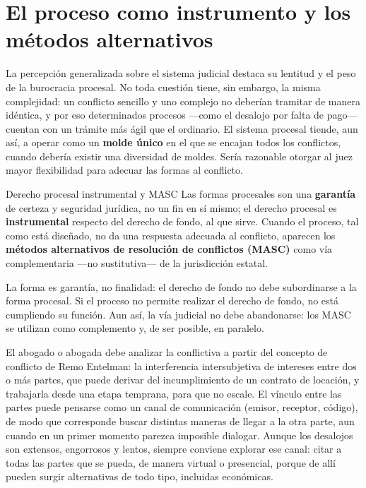 \documentclass[12pt,oneside]{book}
\begin{document}
\section{El proceso como instrumento y los métodos alternativos}

La percepción generalizada sobre el sistema judicial destaca su lentitud y el peso de la burocracia procesal. No toda cuestión tiene, sin embargo, la misma complejidad: un conflicto sencillo y uno complejo no deberían tramitar de manera idéntica, y por eso determinados procesos ---como el desalojo por falta de pago--- cuentan con un trámite más ágil que el ordinario. El sistema procesal tiende, aun así, a operar como un \textbf{molde único} en el que se encajan todos los conflictos, cuando debería existir una diversidad de moldes. Sería razonable otorgar al juez mayor flexibilidad para adecuar las formas al conflicto.

\begin{definition}{Derecho procesal instrumental y MASC}
Las formas procesales son una \textbf{garantía} de certeza y seguridad jurídica, no un fin en sí mismo; el derecho procesal es \textbf{instrumental} respecto del derecho de fondo, al que sirve. Cuando el proceso, tal como está diseñado, no da una respuesta adecuada al conflicto, aparecen los \textbf{métodos alternativos de resolución de conflictos (MASC)} como vía complementaria ---no sustitutiva--- de la jurisdicción estatal.
\end{definition}

\begin{important}
La forma es garantía, no finalidad: el derecho de fondo no debe subordinarse a la forma procesal. Si el proceso no permite realizar el derecho de fondo, no está cumpliendo su función. Aun así, la vía judicial no debe abandonarse: los MASC se utilizan como complemento y, de ser posible, en paralelo.
\end{important}

El abogado o abogada debe analizar la conflictiva a partir del concepto de conflicto de Remo Entelman: la interferencia intersubjetiva de intereses entre dos o más partes, que puede derivar del incumplimiento de un contrato de locación, y trabajarla desde una etapa temprana, para que no escale. El vínculo entre las partes puede pensarse como un canal de comunicación (emisor, receptor, código), de modo que corresponde buscar distintas maneras de llegar a la otra parte, aun cuando en un primer momento parezca imposible dialogar. Aunque los desalojos son extensos, engorrosos y lentos, siempre conviene explorar ese canal: citar a todas las partes que se pueda, de manera virtual o presencial, porque de allí pueden surgir alternativas de todo tipo, incluidas económicas.
\end{document}
